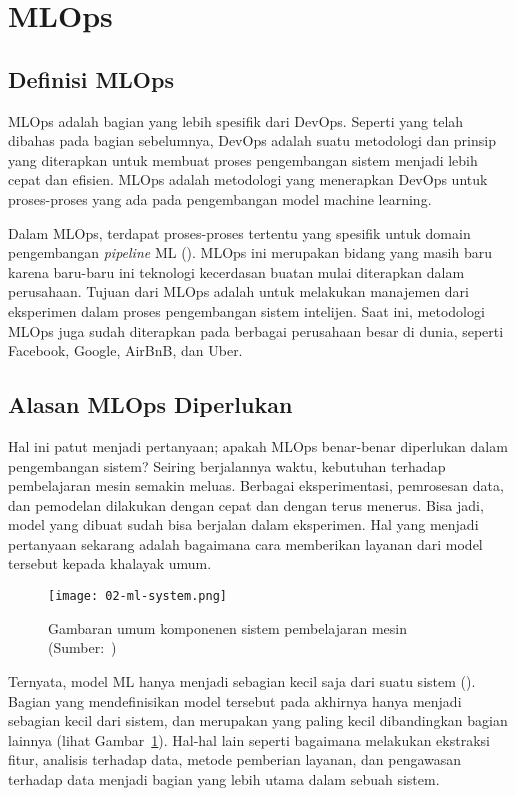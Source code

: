\section{MLOps}

\subsection{Definisi MLOps}

MLOps adalah bagian yang lebih spesifik dari DevOps. 
Seperti yang telah dibahas pada bagian sebelumnya, DevOps adalah suatu metodologi dan prinsip yang diterapkan untuk membuat proses pengembangan sistem menjadi lebih cepat dan efisien.
MLOps adalah metodologi yang menerapkan DevOps untuk proses-proses yang ada pada pengembangan model machine learning.

Dalam MLOps, terdapat proses-proses tertentu yang spesifik untuk domain pengembangan \textit{pipeline} ML (\cite{mlops}).\@
MLOps ini merupakan bidang yang masih baru karena baru-baru ini teknologi kecerdasan buatan mulai diterapkan dalam perusahaan.
Tujuan dari MLOps adalah untuk melakukan manajemen dari eksperimen dalam proses pengembangan sistem intelijen.
Saat ini, metodologi MLOps juga sudah diterapkan pada berbagai perusahaan besar di dunia, seperti Facebook, Google, AirBnB, dan Uber.

\subsection{Alasan MLOps Diperlukan}

Hal ini patut menjadi pertanyaan; apakah MLOps benar-benar diperlukan dalam pengembangan sistem?
Seiring berjalannya waktu, kebutuhan terhadap pembelajaran mesin semakin meluas.
Berbagai eksperimentasi, pemrosesan data, dan pemodelan dilakukan dengan cepat dan dengan terus menerus.
Bisa jadi, model yang dibuat sudah bisa berjalan dalam eksperimen.
Hal yang menjadi pertanyaan sekarang adalah bagaimana cara memberikan layanan dari model tersebut kepada khalayak umum.

\begin{figure}[h]
  \centering
  \texttt{[image: 02-ml-system.png]}
  \caption{Gambaran umum komponenen sistem pembelajaran mesin (Sumber:~\cite{NIPS2015_86df7dcf})}
  \label{fig:ml-system}
\end{figure}

Ternyata, model ML hanya menjadi sebagian kecil saja dari suatu sistem (\cite{NIPS2015_86df7dcf}).
Bagian yang mendefinisikan model tersebut pada akhirnya hanya menjadi sebagian kecil dari sistem, dan merupakan yang paling kecil dibandingkan bagian lainnya (lihat Gambar~\ref{fig:ml-system}).
Hal-hal lain seperti bagaimana melakukan ekstraksi fitur, analisis terhadap data, metode pemberian layanan, dan pengawasan terhadap data menjadi bagian yang lebih utama dalam sebuah sistem.

